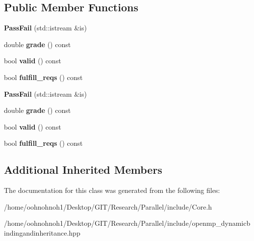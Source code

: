 \subsection*{Public Member Functions}
\begin{DoxyCompactItemize}
\item 
\mbox{\label{classPassFail_a5c90795505aa60da716935c450919b77}} 
{\bfseries Pass\+Fail} (std\+::istream \&is)
\item 
\mbox{\label{classPassFail_a7f96a2d51a1a72c131ee93aa53bd5848}} 
double {\bfseries grade} () const
\item 
\mbox{\label{classPassFail_a06c77d7cd3c48f95476c17c53a6d7e7c}} 
bool {\bfseries valid} () const
\item 
\mbox{\label{classPassFail_a46d15c8f5f28b4c7b8f1311745c9a2a5}} 
bool {\bfseries fulfill\+\_\+reqs} () const
\item 
\mbox{\label{classPassFail_a5c90795505aa60da716935c450919b77}} 
{\bfseries Pass\+Fail} (std\+::istream \&is)
\item 
\mbox{\label{classPassFail_a7f96a2d51a1a72c131ee93aa53bd5848}} 
double {\bfseries grade} () const
\item 
\mbox{\label{classPassFail_a06c77d7cd3c48f95476c17c53a6d7e7c}} 
bool {\bfseries valid} () const
\item 
\mbox{\label{classPassFail_a46d15c8f5f28b4c7b8f1311745c9a2a5}} 
bool {\bfseries fulfill\+\_\+reqs} () const
\end{DoxyCompactItemize}
\subsection*{Additional Inherited Members}


The documentation for this class was generated from the following files\+:\begin{DoxyCompactItemize}
\item 
/home/oohnohnoh1/\+Desktop/\+G\+I\+T/\+Research/\+Parallel/include/Core.\+h\item 
/home/oohnohnoh1/\+Desktop/\+G\+I\+T/\+Research/\+Parallel/include/openmp\+\_\+dynamicbindingandinheritance.\+hpp\end{DoxyCompactItemize}
